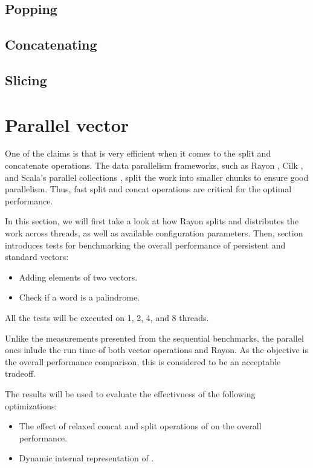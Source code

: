\subsection{Popping}
\subsection{Concatenating}
\subsection{Slicing}

\section{Parallel vector}
One of the claims is that \rrbvec{} is very efficient when it comes to the split and concatenate operations. The data parallelism frameworks, such as Rayon , Cilk , and Scala's parallel collections , split the work into smaller chunks to ensure good parallelism. Thus, fast split and concat operations are critical for the optimal performance. 

In this section, we will first take a look at how Rayon splits and distributes the work across threads, as well as available configuration parameters. Then, section \todo{} introduces tests for benchmarking the overall performance of persistent and standard vectors:

\begin{itemize}    
    \item Adding elements of two vectors.    
    \item Check if a word is a palindrome.         
\end{itemize}

All the tests will be executed on 1, 2, 4, and 8 threads. 

Unlike the measurements presented from the sequential benchmarks, the parallel ones inlude the run time of both vector operations and Rayon. As the objective is the overall performance comparison, this is considered to be an acceptable tradeoff. 

The results will be used to evaluate the effectivness of the following optimizations:
\begin{itemize}
    \item The effect of relaxed concat and split operations of \rrbvec{} on the overall performance. 
    \item Dynamic internal representation of \pvec{}.     
\end{itemize}

